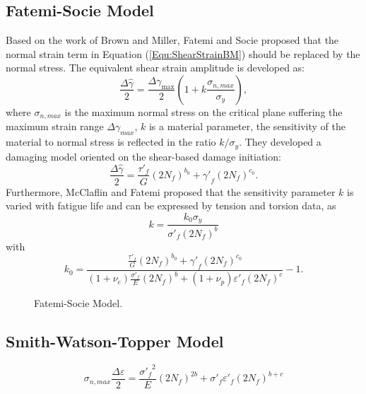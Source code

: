 \documentclass{article}
\begin{document}
\subsection{Fatemi-Socie Model}
Based on the work of Brown and Miller, Fatemi and Socie \cite{Fatemi1988} proposed that the normal strain term in Equation (\ref{Equ:ShearStrainBM}) should be replaced by the normal stress.
The equivalent shear strain amplitude is developed as:
\begin{equation}
\frac{{\Delta \hat \gamma }}{2} = \frac{{\Delta {\gamma _{\max }}}}{2}\left( {1 + k\frac{{{\sigma _{n,max}}}}{{{\sigma _y}}}} \right),
\end{equation}
where
$\sigma _{n,max}$ is the maximum normal stress on the critical plane suffering the maximum strain range $\Delta {\gamma _{max}}$, $k$ is a material parameter, the sensitivity of the material to normal stress is reflected in the ratio $k/\sigma_y$.
They developed a damaging model oriented on the shear-based damage initiation:
\begin{equation}
\frac{{\Delta \hat \gamma }}{2} = \frac{{{{\tau '}_f}}}{G}{\left( {2{N_f}} \right)^{{b_0}}} + {{\gamma '}_f}{\left( {2{N_f}} \right)^{{c_0}}}.
\end{equation}
Furthermore, McClaflin and Fatemi \cite{McClaflin2004} proposed that the sensitivity parameter $k$ is varied with fatigue life and can be expressed by tension and torsion data, as
\begin{equation}
k =  \frac{{k_0 {\sigma _y}}}{{{{\sigma '}_f}{{\left( {2{N_f}} \right)}^b}}}
\end{equation}
with
\[
k_0 =  {\frac{{\frac{{{{\tau '}_f}}}{G}{{\left( {2{N_f}} \right)}^{{b_0}}} + {{\gamma '}_f}{{\left( {2{N_f}} \right)}^{{c_0}}}}}{{\left( {1 + {\nu _e}} \right)\frac{{{{\sigma '}_f}}}{E}{{\left( {2{N_f}} \right)}^b} + \left( {1 + {\nu _p}} \right){{\varepsilon '}_f}{{\left( {2{N_f}} \right)}^c}}} - 1} .
\]

\begin{figure}[!htp]
\caption{Fatemi-Socie Model.}
\label{Fig:NF-NP-TGMF-FS}
\end{figure}

\subsection{Smith-Watson-Topper Model}
\[{\sigma _{n,max}}\frac{{\Delta \varepsilon }}{2} = \frac{{{{\sigma '}_f}^2}}{E}{\left( {2{N_f}} \right)^{2b}} + {\sigma '_f}{\varepsilon '_f}{\left( {2{N_f}} \right)^{b + c}}\]
\end{document}
